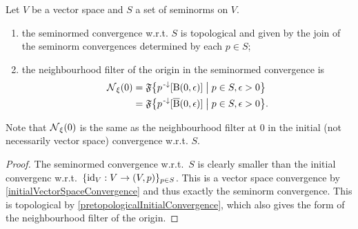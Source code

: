 \begin{proposition} \label{initialSeminormConvergence}
Let $V$ be a vector space and $S$ a set of seminorms on $V$.
\begin{enumerate}
\item the seminormed convergence w.r.t. $S$ is topological and given by the join of the seminorm convergences determined by each $p\in S$;
\item the neighbourhood filter of the origin in the seminormed convergence is
\begin{align*}
\neighbourhood_\xi(0) &= \mathfrak{F}\setbuilder{p^\preimf[\ball(0,\epsilon)]}{p\in S, \epsilon > 0} \\
&= \mathfrak{F}\setbuilder{p^\preimf[\cball(0,\epsilon)]}{p\in S, \epsilon > 0}.
\end{align*}
\end{enumerate}
\end{proposition}
Note that $\operatorname{\mathcal{N}}_\xi(0)$ is the same as the neighbourhood filter at $0$ in the initial (not necessarily vector space) convergence w.r.t. $S$.
\begin{proof}
The seminormed convergence w.r.t.\ $S$ is clearly smaller than the initial convergenc w.r.t.\ $\{\id_V: V\to \sSet{V,p}\}_{p\in S}$. This is a vector space convergence by \ref{initialVectorSpaceConvergence} and thus exactly the seminorm convergence. This is topological by \ref{pretopologicalInitialConvergence}, which also gives the form of the neighbourhood filter of the origin.
\end{proof}

